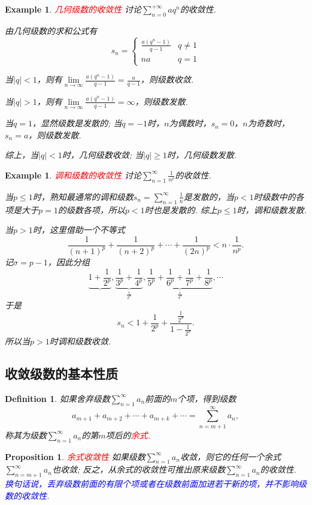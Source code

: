 \documentclass{article}
\newtheorem{proposition}[theorem]{Proposition}
\newtheorem{example}[theorem]{Example}
\newtheorem{definition}[theorem]{Definition}
\newcommand{\redt}[1]{\textcolor{red}{#1}}
\newcommand{\bluet}[1]{\textcolor{blue}{#1}}
\begin{document}
\begin{example}
\rm \redt{几何级数的收敛性} 讨论$\sum\limits_{n=0}^{+\infty}aq^n$的收敛性.

由几何级数的求和公式有
$$
s_n  =  \left \{
\begin{array}{ll}
\frac{a(q^{n}-1)}{q-1} & q\neq 1\\
na & q = 1
\end{array} \right.
$$

当$|q| < 1$，则有$\lim\limits_{n \to \infty} \frac{a(q^{n}-1)}{q-1} = \frac{a}{q-1}$，则级数收敛.

当$|q| > 1$，则有$\lim\limits_{n \to \infty} \frac{a(q^{n}-1)}{q-1} = \infty$，则级数发散.

当$q = 1$，显然级数是发散的; 当$q = -1$时，$n$为偶数时，$s_n =0$，$n$为奇数时，$s_n=a$，则级数发散. 

综上，当$|q| < 1$时，几何级数收敛; 当$|q| \geq 1$时，几何级数发散.   
\end{example}

\begin{example}
\rm \redt{调和级数的收敛性} 讨论$\sum\limits_{n=1}^{\infty} \frac{1}{n^p}$的收敛性.

当$p \leq 1$时，熟知最通常的调和级数$s_n = \sum\limits_{n=1}^{\infty} \frac{1}{n}$是发散的，当$p <1$时级数中的各项是大于$p=1$的级数各项，所以$p < 1$时也是发散的. 综上$p \leq 1$时，调和级数发散. 

当$p > 1$时，这里借助一个不等式
$$
\frac{1}{(n+1)^p} + \frac{1}{(n+2)^p} + \cdots + \frac{1}{(2n)^p} < n \cdot \frac{1}{n^p}.  
$$
记$\sigma = p-1$，因此分组
$$
\underbrace{1+\frac{1}{2^p}},\underbrace{\frac{1}{3^p}+\frac{1}{4^p}}_{\frac{1}{2^\sigma}},\underbrace{\frac{1}{5^p}+\frac{1}{6^p}+\frac{1}{7^p}+\frac{1}{8^p}}_{\frac{1}{4^\sigma}},\cdots
$$
于是
$$
s_n <  1 + \frac{1}{2^p} + \frac{\frac{1}{2^\sigma}}{1-\frac{1}{2^\sigma}}. 
$$
所以当$p > 1$时调和级数收敛. 
\end{example}
\subsection{收敛级数的基本性质}

\begin{definition}
\rm 如果舍弃级数$\sum\limits_{n=1}^\infty a_n$前面的$m$个项，得到级数
$$
a_{m+1} + a_{m+2} + \cdots + a_{m+k} + \cdots = \sum\limits_{n=m+1}^\infty a_n,
$$
称其为级数$\sum\limits_{n=1}^\infty a_n$的第$m$项后的\redt{余式}. 
\end{definition}

\begin{proposition}\label{series-convergence: remnant-convergence}
\rm \redt{余式收敛性} 如果级数$\sum\limits_{n=1}^\infty a_n$收敛，则它的任何一个余式$\sum\limits_{n=m+1}^\infty a_n$也收敛; 反之，从余式的收敛性可推出原来级数$\sum\limits_{n=1}^\infty a_n$的收敛性. \bluet{换句话说，丢弃级数前面的有限个项或者在级数前面加进若干新的项，并不影响级数的收敛性}.
\end{proposition}
\end{document}
